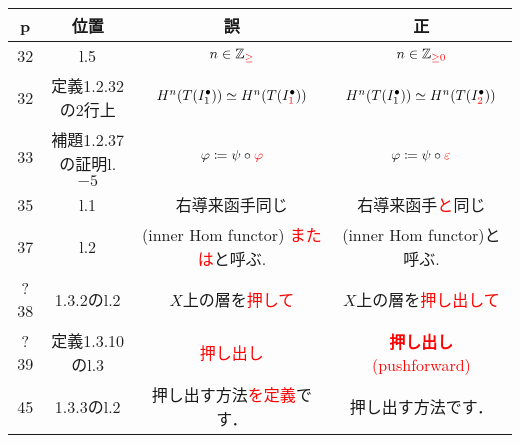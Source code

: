 \begin{table}[h]\centering
\begin{tabular}{|c|c|c|c|}
    \hline
    \rowcolor{lightgray}p&位置 & 誤 & 正 \\
    \hline
    32&l.5
    &\(n\in\mathbb{Z}_{\textcolor{red}{\ge}}\)
    &\(n\in\mathbb{Z}_{\textcolor{red}{\ge0}}\)\\
    \hline
    32&定義1.2.32の2行上
    &\(H^n(T(I_1^\bullet))\simeq H^n(T(I_{\textcolor{red}{1}}^\bullet))\)
    &\(H^n(T(I_1^\bullet))\simeq H^n(T(I_{\textcolor{red}{2}}^\bullet))\)\\    
    \hline
    33&補題1.2.37の証明l.\(-5\)
    &\(\varphi\coloneqq\psi\circ\textcolor{red}{\varphi}\)
    &\(\varphi\coloneqq\psi\circ\textcolor{red}{\varepsilon}\)
    \\\hline
    35&l.1
    &右導来函手同じ
    &右導来函手\textcolor{red}{と}同じ
    \\\hline
    37&l.2
    &(inner Hom functor) \textcolor{red}{または}と呼ぶ.
    &(inner Hom functor)と呼ぶ.
    \\\hline
    ?38&1.3.2のl.2
    &\(X\)上の層を\textcolor{red}{押して}
    &\(X\)上の層を\textcolor{red}{押し出して}\footnotemark[1]
    \\\hline
    ?39&定義1.3.10のl.3
    &\textcolor{red}{押し出し}
    &\textcolor{red}{\textbf{押し出し} (pushforward)}\footnotemark[2]
    \\\hline
    45&1.3.3のl.2
    &押し出す方法\textcolor{red}{を定義}です．
    &押し出す方法です．
    \\\hline
\end{tabular}
\end{table}

